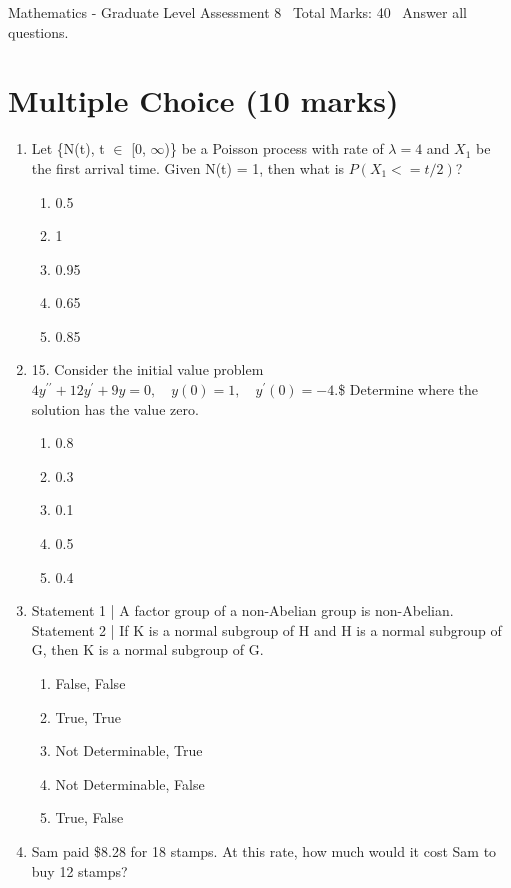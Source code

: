 \documentclass[12pt]{article}
\begin{document}
\begin{center}
Mathematics - Graduate Level Assessment 8 \
Total Marks: 40 \
Answer all questions.
\end{center}

\section*{Multiple Choice (10 marks)}
\begin{enumerate}[label=\arabic*.]
\item Let \{N(t), t \ensuremath{\in} [0, \ensuremath{\infty})\} be a Poisson process with rate of $\lambda = 4$ and $X_1$ be the first arrival time. Given N(t) = 1, then what is $P(X_1 <= t / 2)$?
\begin{enumerate}[label=(\alph*)]
    \item 0.5
    \item 1
    \item 0.95
    \item 0.65
    \item 0.85
\end{enumerate}
\item 15. Consider the initial value problem $ 4 y^{\prime \prime}+12 y^{\prime}+9 y=0, \quad y(0)=1, \quad y^{\prime}(0)=-4 . $\$ Determine where the solution has the value zero.
\begin{enumerate}[label=(\alph*)]
    \item 0.8
    \item 0.3
    \item 0.1
    \item 0.5
    \item 0.4
\end{enumerate}
\item Statement 1 | A factor group of a non-Abelian group is non-Abelian. Statement 2 | If K is a normal subgroup of H and H is a normal subgroup of G, then K is a normal subgroup of G.
\begin{enumerate}[label=(\alph*)]
    \item False, False
    \item True, True
    \item Not Determinable, True
    \item Not Determinable, False
    \item True, False
\end{enumerate}
\item Sam paid \$8.28 for 18 stamps. At this rate, how much would it cost Sam to buy 12 stamps?
\begin{enumerate}[label=(\alph*)]

\end{enumerate}
\end{enumerate}
\end{document}
